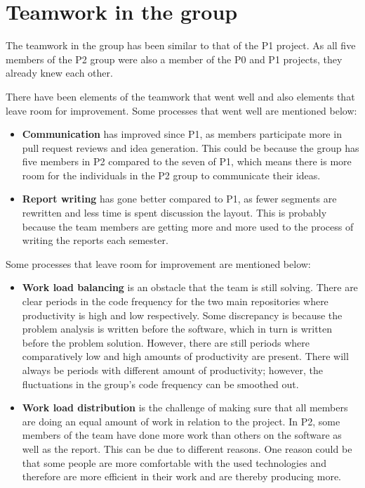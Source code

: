 \section{Teamwork in the group}\label{sec:teamwork-in-the-group}

The teamwork in the group has been similar to that of the P1 project.
As all five members of the P2 group were also a member of the P0 and P1 projects, they already knew each other.

There have been elements of the teamwork that went well and also elements that leave room for improvement.
Some processes that went well are mentioned below:

\begin{itemize}
    \item \textbf{Communication} has improved since P1, as members participate more in pull request reviews and idea
    generation.
    This could be because the group has five members in P2 compared to the seven of P1, which means there
    is more room for the individuals in the P2 group to communicate their ideas.
    \item \textbf{Report writing} has gone better compared to P1, as fewer segments are rewritten and less time is spent
    discussion the layout.
    This is probably because the team members are getting more and more used to the process of writing the reports each
    semester.
\end{itemize}

Some processes that leave room for improvement are mentioned below:

\begin{itemize}
    \item \textbf{Work load balancing} is an obstacle that the team is still solving.
    There are clear periods in the code frequency for the two main repositories where productivity is high and low
    respectively.
    Some discrepancy is because the problem analysis is written before the software, which in turn
    is written before the problem solution.
    However, there are still periods where comparatively low and high amounts of productivity are present.
    There will always be periods with different amount of productivity; however, the fluctuations in the group's code
    frequency can be smoothed out.
    \item \textbf{Work load distribution} is the challenge of making sure that all members are doing an equal amount
    of work in relation to the project.
    In P2, some members of the team have done more work than others on the software as well as the report.
    This can be due to different reasons.
    One reason could be that some people are more comfortable with the used technologies and therefore are more
    efficient in their work and are thereby producing more.
\end{itemize}

